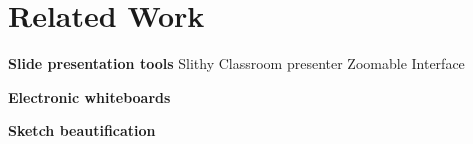 \section{Related Work}

\textbf{Slide presentation tools}
Slithy
Classroom presenter
Zoomable Interface

\textbf{Electronic whiteboards}

\textbf{Sketch beautification}

